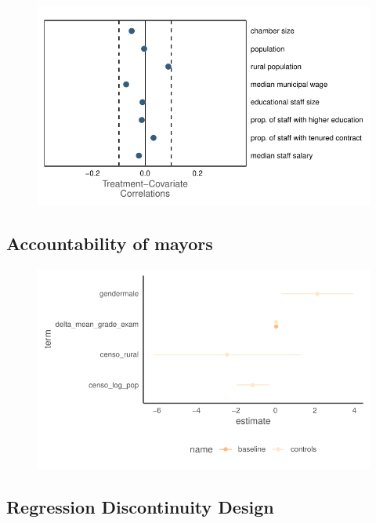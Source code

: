 \documentclass[12pt,a4paper]{article}
\begin{document}
\begin{figure}[h]
    \centering
    \includegraphics{plots/covariate_balance.pdf}
\end{figure}

\pagebreak

\subsection{Accountability of mayors}
\label{app:accountability}

\begin{figure}[h]
    \centering
    \includegraphics{plots/accountability_fit.pdf}
\end{figure}

\pagebreak

\subsection{Regression Discontinuity Design}
\end{document}
